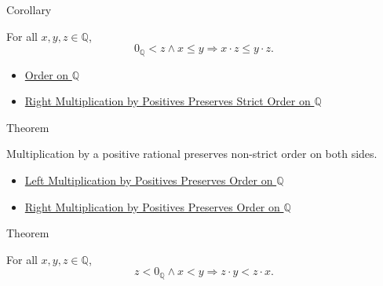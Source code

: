 \begin{corollarybox}{Corollary}
\begin{corollary}
\label{cor:right-positive-multiplication-preserves-order-on-q}
For all $x,y,z\in\mathbb{Q}$,
\[
0_{\mathbb{Q}}<z\land x\le y
\Longrightarrow
x\cdot z\le y\cdot z.
\]
\end{corollary}
\end{corollarybox}

\begin{dependencies}
\begin{itemize}
  \item \hyperref[def:order-on-q]{Order on $\mathbb{Q}$}
  \item \hyperref[cor:right-positive-multiplication-preserves-strict-order-on-q]{Right Multiplication by Positives Preserves Strict Order on $\mathbb{Q}$}
\end{itemize}
\end{dependencies}

\begin{theorembox}{Theorem}
\begin{theorem}
\label{thm:positive-multiplication-preserves-order-on-q}
Multiplication by a positive rational preserves non-strict order on both sides.
\end{theorem}
\end{theorembox}

\begin{dependencies}
\begin{itemize}
  \item \hyperref[thm:left-positive-multiplication-preserves-order-on-q]{Left Multiplication by Positives Preserves Order on $\mathbb{Q}$}
  \item \hyperref[cor:right-positive-multiplication-preserves-order-on-q]{Right Multiplication by Positives Preserves Order on $\mathbb{Q}$}
\end{itemize}
\end{dependencies}

\begin{theorembox}{Theorem}
\begin{theorem}
\label{thm:negative-multiplication-reverses-strict-order-on-q}
For all $x,y,z\in\mathbb{Q}$,
\[
z<0_{\mathbb{Q}}\land x<y
\Longrightarrow
z\cdot y<z\cdot x.
\]
\end{theorem}
\end{theorembox}

